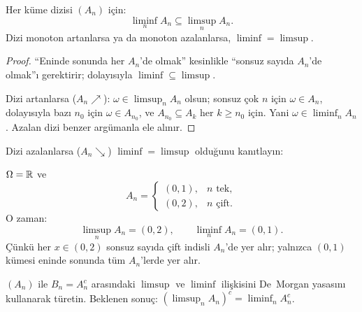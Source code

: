 \begin{teorem}[$\liminf \subseteq \limsup$]\label{thm:liminf_subseteq}
Her küme dizisi $(A_n)$ için:
\[
  \liminf_{n} A_n \subseteq \limsup_{n} A_n.
\]
Dizi monoton artanlarsa ya da monoton azalanlarsa, $\liminf = \limsup$.
\end{teorem}

\begin{proof}
``Eninde sonunda her $A_n$'de olmak'' kesinlikle ``sonsuz sayıda $A_n$'de olmak''ı
gerektirir; dolayısıyla $\liminf \subseteq \limsup$.

Dizi artanlarsa ($A_n \nearrow$): $\omega \in \limsup_n A_n$ olsun; sonsuz çok $n$
için $\omega \in A_n$, dolayısıyla bazı $n_0$ için $\omega \in A_{n_0}$, ve
$A_{n_0} \subseteq A_k$ her $k \geq n_0$ için. Yani $\omega \in \liminf_n A_n$.
Azalan dizi benzer argümanla ele alınır.
\end{proof}

\begin{ispatiskele}
Dizi azalanlarsa ($A_n \searrow$) $\liminf = \limsup$ olduğunu kanıtlayın:



\end{ispatiskele}

\begin{ornek}\label{ex:limsupkume}
$\Omega = \mathbb{R}$ ve
\[
  A_n =
  \begin{cases}
    (0,1), & n \text{ tek}, \\
    (0,2), & n \text{ çift}.
  \end{cases}
\]
O zaman:
\[
  \limsup_n A_n = (0,2),
  \qquad
  \liminf_n A_n = (0,1).
\]
Çünkü her $x \in (0,2)$ sonsuz sayıda çift indisli $A_n$'de yer alır;
yalnızca $(0,1)$ kümesi eninde sonunda tüm $A_n$'lerde yer alır.
\end{ornek}

\begin{kendinleifade}
$(A_n)$ ile $B_n = A_n^c$ arasındaki $\limsup$ ve $\liminf$ ilişkisini
De~Morgan yasasını kullanarak türetin. Beklenen sonuç:
$\left(\limsup_n A_n\right)^c = \liminf_n A_n^c$.
\end{kendinleifade}

